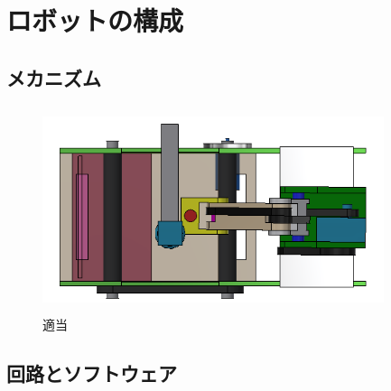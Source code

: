 \section{ロボットの構成}

\subsection{メカニズム}

\begin{figure}[htbp]
  \begin{center}
    \includegraphics[width=10cm,height=6cm]{img/kitai.jpg}
    \caption{適当}
    \label{fig:one}
  \end{center}
\end{figure}

\subsection{回路とソフトウェア}
